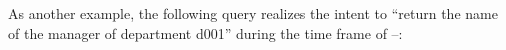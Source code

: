

As another example, the following query realizes the intent to ``return the
name of the manager of department d001'' during the time frame of
\vThree--\vFive:
%

